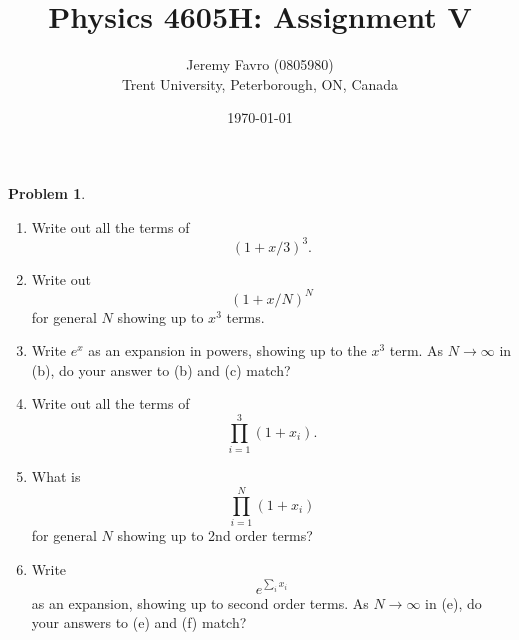 \documentclass[10pt]{article}
\title{Physics 4605H: Assignment V}
\author{Jeremy Favro (0805980) \\ Trent University, Peterborough, ON, Canada}
\date{\today}
\theoremstyle{definition}
\newtheorem{problem}{Problem}
\begin{document}
\maketitle

\setcounter{problem}{1}
\setcounter{soln}{1}
\begin{problem}
~
\begin{enumerate}[label=(\alph*)]
  \item Write out all the terms of $$\left(1+x/3\right)^3.$$
  \item Write out $$(1+x/N)^N$$ for general $N$ showing up to $x^3$ terms.
  \item Write $e^x$ as an expansion in powers, showing up to the $x^3$ term. As $N\to\infty$ in (b), do your answer to (b) and (c) match?
  \item Write out all the terms of $$\prod_{i=1}^3(1+x_i).$$
  \item What is $$\prod_{i=1}^N(1+x_i)$$ for general $N$ showing up to 2nd order terms?
  \item Write $$e^{\sum_{i}x_i}$$
        as an expansion, showing up to second order terms. As $N\to\infty$ in (e), do your answers to (e) and (f) match?
\end{enumerate}
\end{problem}
\end{document}
